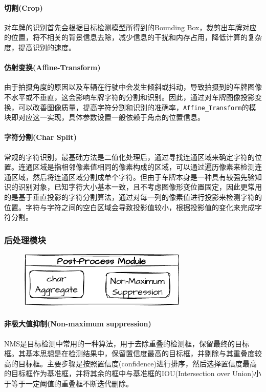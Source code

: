 \documentclass[master,anonymous]{shtthesis}
\begin{document}
\paragraph{切割(Crop)}
对车牌的识别首先会根据目标检测模型所得到的Bounding Box，裁剪出车牌对应的位置，将不相关的背景信息去除，减少信息的干扰和内存占用，降低计算的复杂度，提高识别的速度。

\paragraph{仿射变换(Affine-Transform)}
由于拍摄角度的原因以及车辆在行驶中会发生倾斜或抖动，导致拍摄到的车牌图像不水平或不垂直，这会影响车牌字符的分割和识别。因此，通过对车牌图像投影变换，可以改善图像质量，提高字符分割和识别的准确率，\verb*|Affine_Transform|的模块即对应这一实现，具体参数设置一般依赖于角点的位置信息。

\paragraph{字符分割(Char Split)}\label{字符分割}
常规的字符识别，最基础方法是二值化处理后，通过寻找连通区域来确定字符的位置。连通区域是指相邻像素值相同的像素构成的区域，可以通过遍历像素来检测连通区域，然后将连通区域分割成单个字符。但由于车牌本身是一种具有较强先验知识的识别对象，已知字符大小基本一致，且不考虑图像形变位置固定，因此更常用的是基于垂直投影的字符分割算法，通过对每一列的像素值进行投影来检测字符的位置。字符与字符之间的空白区域会导致投影值较小，根据投影值的变化来完成字符分割。


\subsubsection{后处理模块}
\begin{figure}[H]
	\centering
	\includegraphics[width=8cm]{img/m2.pdf}
	\label{后处理模块汇总}
\end{figure}
\paragraph{非极大值抑制(Non-maximum suppression)}
NMS是目标检测中常用的一种算法，用于去除重叠的检测框，保留最终的目标框。其基本思想是在检测结果中，保留置信度最高的目标框，并剔除与其重叠度较高的目标框。主要步骤是按照置信度(confidence)进行排序，然后选择置信度最高的目标框作为基准框，并将其余的框中与基准框的IOU(Intersection over Union)小于等于一定阈值的重叠框不断迭代删除。
\end{document}
